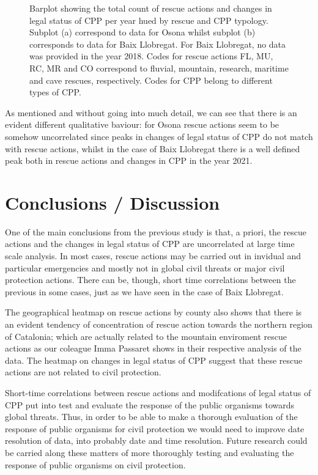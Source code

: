 \documentclass[
  journal=small,
  manuscript=mini-article,  %
  year=2023,
  volume=1,
]{odj-journal}
\begin{document}
\begin{figure}
\begin{subfigure}{0.47\textwidth}
\caption{}
\label{fig:sub2}
\end{subfigure}
\caption{Barplot showing the total count of rescue actions and changes in legal status of CPP per year hued by rescue and CPP typology. Subplot (a) correspond to data for Osona whilst subplot (b) corresponds to data for Baix Llobregat. For Baix Llobregat, no data was provided in the year 2018. Codes for rescue actions FL, MU, RC, MR and CO correspond to fluvial, mountain, research, maritime and cave rescues, respectively. Codes for CPP belong to different types of CPP.}
\end{figure}
As mentioned and without going into much detail, we can see that there is an evident different qualitative baviour: for Osona rescue actions seem to be somehow uncorrelated since peaks in changes of legal status of CPP do not match with rescue actions, whilst in the case of Baix Llobregat there is a well defined peak both in rescue actions and changes in CPP in the year 2021.

\section{Conclusions / Discussion}\label{sec:conclusions}
One of the main conclusions from the previous study is that, a priori, the rescue actions and the changes in legal status of CPP are uncorrelated at large time scale analysis. In most cases, rescue actions may be carried out in invidual and particular emergencies and mostly not in global civil threats or major civil protection actions. There can be, though, short time correlations between the previous in some cases, just as we have seen in the case of Baix Llobregat. 

The geographical heatmap on rescue actions by county also shows that there is an evident tendency of concentration of rescue action towards the northern region of Catalonia; which are actually related to the mountain enviroment rescue actions as our coleague Imma Passaret shows in their respective analysis of the data. The heatmap on changes in legal status of CPP suggest that these rescue actions are not related to civil protection.

Short-time correlations between rescue actions and modifcations of legal status of CPP put into test and evaluate the response of the public organisms towards global threats. Thus, in order to be able to make a thorough evaluation of the response of public organisms for civil protection we would need to improve date resolution of data, into probably date and time resolution. Future research could be carried along these matters of more thoroughly testing and evaluating the response of public organisms on civil protection.





\end{document}
